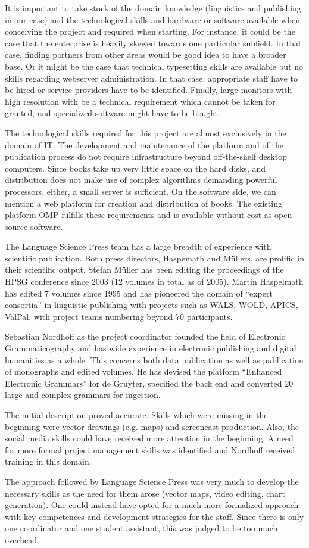 \documentclass[output=guidelines,nonflat,smallfont,
draftmode
]{langsci/langscibook}
\newcommand{\background}[1]{ 
  \vspace{5mm}
  \renewcommand{\tblslinecolour}{lsDarkBlue}
  \tblssy[red]{explore2}{Background}{\vspace*{-5mm}#1}
}
\newcommand{\langscisolution}[1]{
  \renewcommand{\tblslinecolour}{lsLightBlue}
  \tblssy{langsci}{LangSci solution}{\vspace*{-5mm}#1}
}
\newcommand{\evaluation}[1]{
  \renewcommand{\tblslinecolour}{lsLightOrange}
  \tblssy{receipt}{Evaluation}{\vspace*{-5mm}#1}
}
\newcommand{\othersolutions}[1]{
  \renewcommand{\tblslinecolour}{lsDarkGreenOne}
  \tblssy{more}{Other solutions}{\vspace*{-5mm}#1}
}
\renewcommand{\tblssy}[4][black!12]{%
  \renewcommand{\langscisymbol}{#2}\renewcommand{\tblsboxcolor}{#1}
  \begin{mdframed}[style=yellowexercise,frametitle={#3}]
    #4
  \end{mdframed}
}
\begin{document}
\background{It is important to take stock of the domain knowledge (linguistics and publishing in our case) and the technological skills and hardware or software available when conceiving the project and required when starting. For instance, it could be the case that the enterprise is heavily skewed towards one particular subfield. In that case, finding partners from other areas would be good idea to have a broader base. Or it might be the case that technical typesetting skills are available but no skills regarding webserver administration. In that case, appropriate staff have to be hired or service providers have to be identified. Finally, large monitors with high resolution with be a technical requirement which cannot be taken for granted, and specialized software might have to be bought.}
\langscisolution{
The technological skills required for this project are almost exclusively in the domain of IT. The development and maintenance of the platform and of the publication process do not require infrastructure beyond off-the-shelf desktop computers. Since books take up very little space on the hard disks, and distribution does not make use of complex algorithms demanding powerful processors, either, a small server is sufficient. 
On the software side, we can mention a web platform for creation and distribution of books. The existing platform OMP fulfills these requirements and is available without cost as open source software.

The Language Science Press team has a large breadth of experience with scientific publication. Both press directors, Haspemath and Müllers, are prolific in their scientific output. Stefan Müller has been editing the proceedings of the HPSG conference since 2003 (12 volumes in total as of 2005). Martin Haspelmath has edited 7 volumes since 1995 and has pioneered the domain of ``expert consortia'' in linguistic publishing with projects such as WALS, WOLD, APICS, ValPal, with project teams numbering beyond 70 participants. 

Sebastian Nordhoff as the project coordinator founded the field of Electronic Grammaticography and has wide experience in electronic publishing and digital humanities as a whole. This concerns both data publication as well as publication of monographs and edited volumes. He has devised the platform ``Enhanced Electronic Grammars'' for de Gruyter, specified the back end and converted 20 large and complex grammars for ingestion.
}
\evaluation{The initial description proved accurate. Skills which were missing in the beginning were vector drawings (e.g. maps) and screencast production. Also, the social media skills could have received more attention in the beginning.  A need for more formal project management skills was identified and Nordhoff received training in this domain.}
\othersolutions{The approach followed by Language Science Press was very much to develop the necessary skills as the need for them arose (vector maps, video editing, chart generation). One could instead have opted for a much more formalized approach with key competences and development strategies for the staff. Since there is only one coordinator and one student assistant, this was judged to be too much overhead.}
\end{document}
